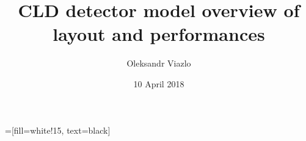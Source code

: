 \documentclass[8pt]{beamer}
\newif\ifplacelogo %
\begin{document}
\newcommand{\myNode}{\tikz[baseline,inner sep=1pt] \node[anchor=base]}

 =[fill=white!15, text=black]



\title[ CLD detector performance  \hspace{16.5em}\insertframenumber/
\inserttotalframenumber]{ CLD detector model overview of layout and performances}


	\author[Oleksandr Viazlo]{Oleksandr Viazlo \\ 
	}
	
       
	\date{10 April 2018}


	

   	

\placelogofalse

{

}
\end{document}
